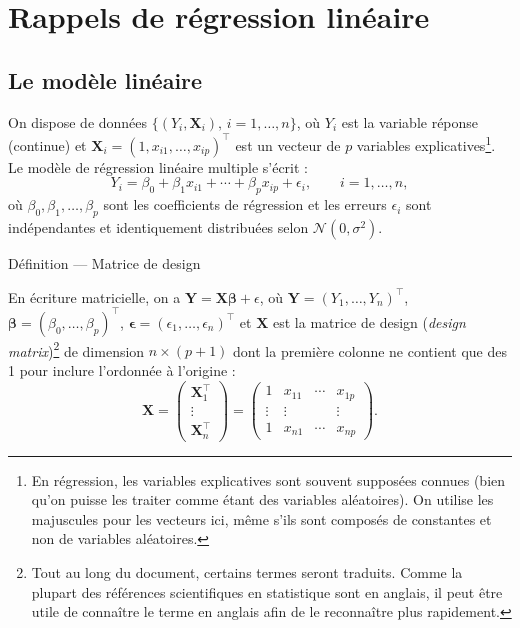 \documentclass[
  french,
  letterpaper,
  DIV=11,
  numbers=noendperiod]{scrreprt}
\begin{document}
\chapter{Rappels de régression
linéaire}\label{rappels-de-ruxe9gression-linuxe9aire}

\section{Le modèle linéaire}\label{le-moduxe8le-linuxe9aire}

On dispose de données \(\{(Y_i, \boldsymbol{X}_i),\, i=1,\ldots,n\}\),
où \(Y_i\) est la variable réponse (continue) et
\(\boldsymbol{X}_i=(1,x_{i1},\ldots,x_{ip})^\top\) est un vecteur de
\(p\) variables explicatives\footnote{En régression, les variables
  explicatives sont souvent supposées connues (bien qu'on puisse les
  traiter comme étant des variables aléatoires). On utilise les
  majuscules pour les vecteurs ici, même s'ils sont composés de
  constantes et non de variables aléatoires.}. Le modèle de régression
linéaire multiple s'écrit :
\[Y_i = \beta_0 + \beta_1 x_{i1} + \cdots + \beta_p x_{ip} + \epsilon_i, \qquad i=1,\ldots,n,\]
où \(\beta_0,\beta_1,\ldots,\beta_p\) sont les coefficients de
régression et les erreurs \(\epsilon_i\) sont indépendantes et
identiquement distribuées selon \(\mathcal{N}(0,\sigma^2)\).

{Définition --- Matrice de design}

En écriture matricielle, on a
\(\boldsymbol{Y} = \boldsymbol{X\beta} + \epsilon\), où
\(\boldsymbol{Y}=(Y_1,\ldots,Y_n)^\top\),
\(\boldsymbol{\beta}=(\beta_0,\ldots,\beta_p)^\top\),
\(\boldsymbol{\epsilon}=(\epsilon_1,\ldots,\epsilon_n)^\top\) et
\(\boldsymbol{X}\) est la matrice de design (\emph{design
matrix})\footnote{Tout au long du document, certains termes seront
  traduits. Comme la plupart des références scientifiques en statistique
  sont en anglais, il peut être utile de connaître le terme en anglais
  afin de le reconnaître plus rapidement.} de dimension \(n\times(p+1)\)
dont la première colonne ne contient que des 1 pour inclure l'ordonnée à
l'origine : \[\boldsymbol{X} =
 \begin{pmatrix}  \boldsymbol{X}_1^\top \\  \vdots  \\   \boldsymbol{X}_n^\top\end{pmatrix}=\begin{pmatrix} 1 & x_{11} & \cdots & x_{1p} \\ \vdots & \vdots & & \vdots \\ 1 & x_{n1} & \cdots & x_{np}\end{pmatrix}.\]
\end{document}
